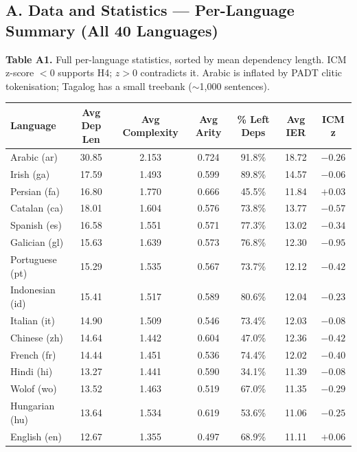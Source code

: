 \documentclass[11pt,a4paper]{article}
\begin{document}
\subsection*{A. Data and Statistics --- Per-Language Summary (All 40 Languages)}

\noindent\textbf{Table A1.} Full per-language statistics, sorted by mean dependency length. ICM z-score $< 0$ supports H4; $z > 0$ contradicts it. Arabic is inflated by PADT clitic tokenisation; Tagalog has a small treebank (${\sim}$1,000 sentences).

\begin{table}[H]
\centering\scriptsize
\setlength{\tabcolsep}{5pt}
\begin{tabular}{@{}lcccccc@{}}
\toprule
\textbf{Language} & \textbf{Avg Dep Len} & \textbf{Avg Complexity} & \textbf{Avg Arity} & \textbf{\% Left Deps} & \textbf{Avg IER} & \textbf{ICM z} \\
\midrule
Arabic (ar)     & 30.85 & 2.153 & 0.724 & 91.8\% & 18.72 & $-0.26$ \\
Irish (ga)      & 17.59 & 1.493 & 0.599 & 89.8\% & 14.57 & $-0.06$ \\
Persian (fa)    & 16.80 & 1.770 & 0.666 & 45.5\% & 11.84 & $+0.03$ \\
Catalan (ca)    & 18.01 & 1.604 & 0.576 & 73.8\% & 13.77 & $-0.57$ \\
Spanish (es)    & 16.58 & 1.551 & 0.571 & 77.3\% & 13.02 & $-0.34$ \\
Galician (gl)   & 15.63 & 1.639 & 0.573 & 76.8\% & 12.30 & $-0.95$ \\
Portuguese (pt) & 15.29 & 1.535 & 0.567 & 73.7\% & 12.12 & $-0.42$ \\
Indonesian (id) & 15.41 & 1.517 & 0.589 & 80.6\% & 12.04 & $-0.23$ \\
Italian (it)    & 14.90 & 1.509 & 0.546 & 73.4\% & 12.03 & $-0.08$ \\
Chinese (zh)    & 14.64 & 1.442 & 0.604 & 47.0\% & 12.36 & $-0.42$ \\
French (fr)     & 14.44 & 1.451 & 0.536 & 74.4\% & 12.02 & $-0.40$ \\
Hindi (hi)      & 13.27 & 1.441 & 0.590 & 34.1\% & 11.39 & $-0.08$ \\
Wolof (wo)      & 13.52 & 1.463 & 0.519 & 67.0\% & 11.35 & $-0.29$ \\
Hungarian (hu)  & 13.64 & 1.534 & 0.619 & 53.6\% & 11.06 & $-0.25$ \\
English (en)    & 12.67 & 1.355 & 0.497 & 68.9\% & 11.11 & $+0.06$ \\

\end{tabular}
\end{table}
\end{document}
